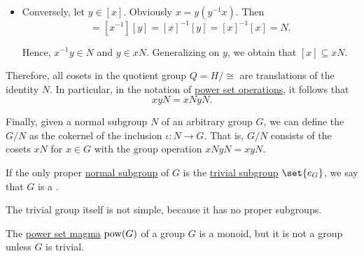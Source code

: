 \begin{definition}
\begin{thmenum}
\begin{itemize}
      \item Conversely, let \( y \in [x] \). Obviously \( x = y (y^{-1} x) \). Then
      \begin{equation*}
        [x^{-1} y] = [x^{-1}] [y] = [x]^{-1} [y] = [x]^{-1} [x] = N.
      \end{equation*}

      Hence, \( x^{-1} y \in N \) and \( y \in xN \). Generalizing on \( y \), we obtain that \( [x] \subseteq xN \).
    \end{itemize}

    Therefore, all cosets in the quotient group \( Q = H / {\cong} \) are translations of the identity \( N \). In particular, in the notation of \hyperref[def:magma/powet_set]{power set operations}, it follows that
    \begin{equation*}
      xyN = xN yN.
    \end{equation*}

    Finally, given a normal subgroup \( N \) of an arbitrary group \( G \), we can define the  \( G / N \) as the cokernel of the inclusion \( \iota: N \to G \). That is, \( G / N \) consists of the cosets \( xN \) for \( x \in G \) with the group operation \( xN yN = xyN \).

     If the only proper \hyperref[thm:normal_subgroup_equivalences]{normal subgroup} of \( G \) is the \hyperref[def:group/trivial]{trivial subgroup} \( \set{ e_G } \), we say that \( G \) is a .

    The trivial group itself is not simple, because it has no proper subgroups.
  \end{thmenum}
\end{definition}

\begin{example}\label{ex:power_set_is_not_a_group}
  The \hyperref[def:magma/power_set]{power set magma} \( \operatorname{pow}(G) \) of a group \( G \) is a monoid, but it is not a group unless \( G \) is trivial.
\end{example}

